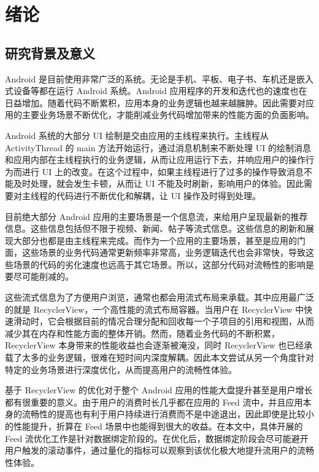 \chapter{绪论}

\section{研究背景及意义}

Android 是目前使用非常广泛的系统\cite{businge2019studying}。无论是手机、平板、电子书、车机还是嵌入式设备等都在运行 Android 系统。Android 应用程序的开发和迭代也的速度也在日益增加。随着代码不断累积，应用本身的业务逻辑也越来越臃肿。因此需要对应用的主要业务场景不断优化，才能削减业务代码增加带来的性能方面的负面影响。

Android 系统的大部分 UI 绘制是交由应用的主线程来执行\cite{yan2014real}。主线程从 ActivityThread 的 main 方法开始运行，通过消息机制来不断处理 UI 的绘制消息和应用内部在主线程执行的业务逻辑，从而让应用运行下去，并响应用户的操作行为而进行 UI 上的改变。在这个过程中，如果主线程进行了过多的操作导致消息不能及时处理，就会发生卡顿，从而让 UI 不能及时刷新，影响用户的体验。因此需要对主线程的代码进行不断优化和解耦，让 UI 操作及时得到处理。

目前绝大部分 Android 应用的主要场景是一个信息流，来给用户呈现最新的推荐信息。这些信息包括但不限于视频、新闻、帖子等流式信息。这些信息的刷新和展现大部分也都是由主线程来完成。而作为一个应用的主要场景，甚至是应用的门面，这些场景的业务代码通常更新频率非常高，业务逻辑迭代也会非常快，导致这些场景的代码的劣化速度也远高于其它场景。所以，这部分代码对流畅性的影响是要尽可能削减的。

这些流式信息为了方便用户浏览，通常也都会用流式布局来承载。其中应用最广泛的就是 RecyclerView，一个高性能的流式布局容器\cite{sabiyath2020enhanced}。当用户在 RecyclerView 中快速滑动时，它会根据目前的情况合理分配和回收每一个子项目的引用和视图，从而减少其在内存和性能方面的整体开销。然而，随着业务代码的不断积累，RecyclerView 本身带来的性能收益也会逐渐被淹没，同时 RecyclerView 也已经承载了太多的业务逻辑，很难在短时间内深度解耦。因此本文尝试从另一个角度针对特定的业务场景进行深度优化，从而提高用户的流畅性体验。

基于 RecyclerView 的优化对于整个 Android 应用的性能大盘提升甚至是用户增长都有很重要的意义。由于用户的消费时长几乎都在应用的 Feed 流中，并且应用本身的流畅性的提高也有利于用户持续进行消费而不是中途退出，因此即使是比较小的性能提升，折算在 Feed 场景中也能得到很大的收益。在本文中，具体开展的 Feed 流优化工作是针对数据绑定阶段的。在优化后，数据绑定阶段会尽可能避开用户触发的滚动事件，通过量化的指标可以观察到该优化极大地提升流用户的流畅性体验。

